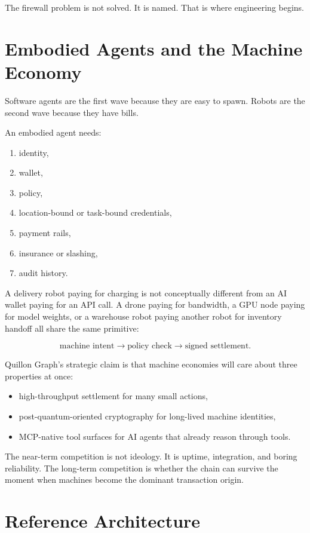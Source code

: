 \documentclass[11pt,a4paper]{article}
\begin{document}
The firewall problem is not solved. It is named. That is where engineering begins.

\section{Embodied Agents and the Machine Economy}

Software agents are the first wave because they are easy to spawn. Robots are the second wave because they have bills.

An embodied agent needs:

\begin{enumerate}[leftmargin=1.2cm]
  \item identity,
  \item wallet,
  \item policy,
  \item location-bound or task-bound credentials,
  \item payment rails,
  \item insurance or slashing,
  \item audit history.
\end{enumerate}

A delivery robot paying for charging is not conceptually different from an AI wallet paying for an API call. A drone paying for bandwidth, a GPU node paying for model weights, or a warehouse robot paying another robot for inventory handoff all share the same primitive:

\[
\text{machine intent} \rightarrow \text{policy check} \rightarrow \text{signed settlement}.
\]

Quillon Graph's strategic claim is that machine economies will care about three properties at once:

\begin{itemize}[leftmargin=1.2cm]
  \item high-throughput settlement for many small actions,
  \item post-quantum-oriented cryptography for long-lived machine identities,
  \item MCP-native tool surfaces for AI agents that already reason through tools.
\end{itemize}

The near-term competition is not ideology. It is uptime, integration, and boring reliability. The long-term competition is whether the chain can survive the moment when machines become the dominant transaction origin.

\section{Reference Architecture}
\end{document}
